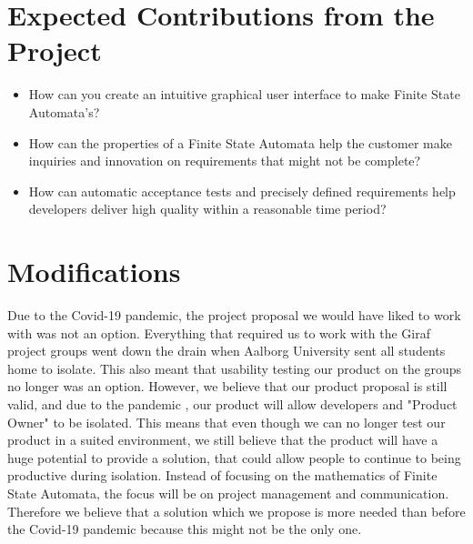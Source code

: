 \section{Expected Contributions from the Project}
\begin{itemize}
    \item How can you create an intuitive graphical user interface to make Finite State Automata's?
    \item How can the properties of a Finite State Automata help the customer make inquiries and innovation on requirements that might not be complete?
    \item How can automatic acceptance tests and precisely defined requirements help developers deliver high quality within a reasonable time period?
\end{itemize}

\section{Modifications}
Due to the Covid-19 pandemic, the project proposal we would have liked to work with was not an option.
Everything that required us to work with the Giraf project groups went down the drain when Aalborg University sent all students home to isolate.
This also meant that usability testing our product on the groups no longer was an option. 
However, we believe that our product proposal is still valid, and due to the pandemic , our product will allow developers and "Product Owner" to be isolated.
This means that even though we can no longer test our product in a suited environment, we still believe that the product will have a huge potential to provide a solution, that could allow people to continue to being productive during isolation.
Instead of focusing on the mathematics of Finite State Automata, the focus will be on project management and communication.
Therefore we believe that a solution which we propose is more needed than before the Covid-19 pandemic because this might not be the only one.
